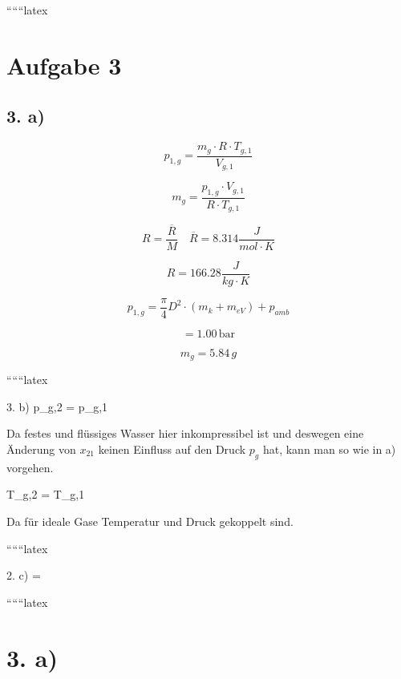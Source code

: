 
``````latex


\section*{Aufgabe 3}

\subsection*{3. a)}

\begin{equation*}
    p_{1,g} = \frac{m_g \cdot R \cdot T_{g,1}}{V_{g,1}}
\end{equation*}

\begin{equation*}
    m_g = \frac{p_{1,g} \cdot V_{g,1}}{R \cdot T_{g,1}}
\end{equation*}

\begin{equation*}
    R = \frac{\overline{R}}{M} \quad \overline{R} = 8.314 \frac{J}{mol \cdot K}
\end{equation*}

\begin{equation*}
    R = 166.28 \frac{J}{kg \cdot K}
\end{equation*}

\begin{equation*}
    p_{1,g} = \frac{\pi}{4} D^2 \cdot (m_k + m_{eV}) + p_{amb}
\end{equation*}

\begin{equation*}
    = 1.00 \, \text{bar}
\end{equation*}

\begin{equation*}
    m_g = 5.84 \, g
\end{equation*}

``````latex


3. b) \quad p_{g,2} = p_{g,1}

Da festes und flüssiges Wasser hier inkompressibel ist und deswegen eine Änderung von $x_{21}$ keinen Einfluss auf den Druck $p_{g}$ hat, kann man so wie in a) vorgehen.

T_{g,2} = T_{g,1}

Da für ideale Gase Temperatur und Druck gekoppelt sind.

``````latex


2. c) \quad {} =

``````latex


\section*{3. a)}

